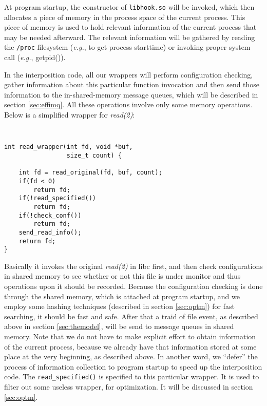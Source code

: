 \documentclass[letterpaper,twocolumn,10pt]{article}
\begin{document}
At program startup, the constructor of \texttt{libhook.so} will be invoked,
which then allocates a piece of memory in the process space of the current
process. This piece of memory is used to hold relevant information of the
current process that may be needed afterward. The relevant information will
be gathered by reading the \texttt{/proc} filesystem (\textit{e.g.}, to get
process starttime) or invoking proper system call (\textit{e.g.}, getpid()). 

In the interposition code, all our wrappers will perform configuration
checking, gather information about this particular function invocation and
then send those information to the in-shared-memory message queues, which
will be described in section \ref{sec:effimq}. All these operations involve
only some memory operations. Below is a simplified wrapper for
\textit{read(2)}: 

{\tt \small
\begin{verbatim}
int read_wrapper(int fd, void *buf,
                 size_t count) {

    int fd = read_original(fd, buf, count);
    if(fd < 0)
        return fd;
    if(!read_specified())
        return fd;
    if(!check_conf())
        return fd;
    send_read_info();
    return fd;
}
\end{verbatim}
}

\noindent
Basically it invokes the original \textit{read(2)} in libc first, and then
check configurations in shared memory to see whether or not this file is
under monitor and thus operations upon it should be recorded. Because the
configuration checking is done through the shared memory, which is attached
at program startup, and we employ some hashing techniques (described in
section \ref{sec:optm}) for fast searching, it should be fast and safe. After
that a traid of file event, as described above in section \ref{sec:themodel},
will be send to message queues in shared memory. Note that we do not have to
make explicit effort to obtain information of the current process, because we
already have that information stored at some place at the very beginning, as
described above. In another word, we ``defer'' the process of information
collection to program startup to speed up the interposition code. The
\texttt{read\_specified()} is specified to this particular wrapper. It is
used to filter out some useless wrapper, for optimization. It will be
discussed in section \ref{sec:optm}.\\ 
\end{document}
